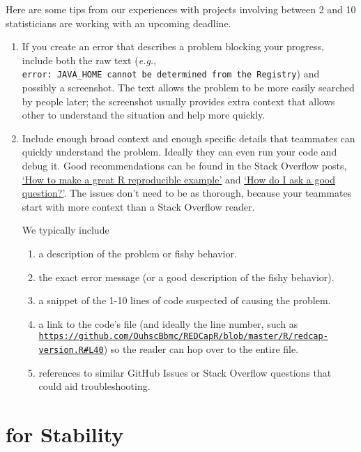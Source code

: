 \documentclass[
]{book}
\begin{document}
Here are some tips from our experiences with projects involving between 2 and 10 statisticians are working with an upcoming deadline.

\begin{enumerate}
\def\labelenumi{\arabic{enumi}.}
\item
  If you create an error that describes a problem blocking your progress, include both the raw text (\emph{e.g.}, \texttt{error:\ JAVA\_HOME\ cannot\ be\ determined\ from\ the\ Registry}) and possibly a screenshot. The text allows the problem to be more easily searched by people later; the screenshot usually provides extra context that allows other to understand the situation and help more quickly.
\item
  Include enough broad context and enough specific details that teammates can quickly understand the problem. Ideally they can even run your code and debug it. Good recommendations can be found in the Stack Overflow posts, \href{https://stackoverflow.com/questions/5963269/how-to-make-a-great-r-reproducible-example?rq=1}{`How to make a great R reproducible example'} and \href{https://stackoverflow.com/help/how-to-ask}{`How do I ask a good question?'}. The issues don't need to be as thorough, because your teammates start with more context than a Stack Overflow reader.

  We typically include

  \begin{enumerate}
  \def\labelenumii{\arabic{enumii}.}
  \item
    a description of the problem or fishy behavior.
  \item
    the exact error message (or a good description of the fishy behavior).
  \item
    a snippet of the 1-10 lines of code suspected of causing the problem.
  \item
    a link to the code's file (and ideally the line number, such as \href{https://github.com/OuhscBbmc/REDCapR/blob/master/R/redcap-version.R\#L40}{\texttt{https://github.com/OuhscBbmc/REDCapR/blob/master/R/redcap-version.R\#L40}}) so the reader can hop over to the entire file.
  \item
    references to similar GitHub Issues or Stack Overflow questions that could aid troubleshooting.
  \end{enumerate}
\end{enumerate}

\hypertarget{git-stability}{%
\section{for Stability}\label{git-stability}}
\end{document}
